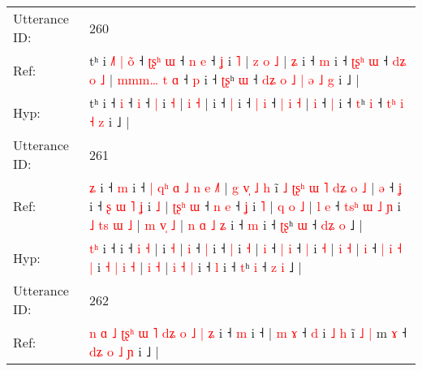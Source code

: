 \documentclass[10pt]{article}
\DeclareRobustCommand{\hl}[1]{{\textcolor{red}{#1}}}
\begin{document}
\begin{longtable}{ll}
 \\
\midrule
Utterance ID: & 260 \\
Ref: & tʰ i\hl{ }\hl{˩}\hl{˥}\hl{ }\hl{|}\hl{ }\hl{o}\hl{̃} ˧\hl{ }\hl{ʈ}\hl{ʂ}\hl{ʰ} \hl{ɯ} ˧\hl{ }\hl{n} \hl{e} ˧ \hl{ʝ} i \hl{˥} |\hl{ }\hl{z} \hl{o} \hl{˩} |\hl{ }\hl{ʑ} i ˧ \hl{m} i ˧ \hl{ʈ}\hl{ʂ}\hl{ʰ} \hl{ɯ} ˧ \hl{d}\hl{ʑ} \hl{o} \hl{˩} |\hl{ }\hl{m}\hl{m}\hl{m}\hl{…}\hl{ }\hl{t} \hl{ɑ} ˧ \hl{p} i ˧ \hl{ʈ}\hl{ʂ}ʰ \hl{ɯ} ˧\hl{ }\hl{d}\hl{ʑ}\hl{ }\hl{o} \hl{˩}\hl{ }\hl{|} \hl{ə} \hl{˩} \hl{g} i ˩ |
 \\
Hyp: & tʰ i\hl{}\hl{}\hl{}\hl{}\hl{}\hl{}\hl{}\hl{} ˧\hl{}\hl{}\hl{}\hl{} \hl{i} ˧\hl{}\hl{} \hl{i} ˧ \hl{|} i \hl{˧} |\hl{}\hl{} \hl{i} \hl{˧} |\hl{}\hl{} i ˧ \hl{|} i ˧ \hl{}\hl{}\hl{|} \hl{i} ˧ \hl{}\hl{|} \hl{i} \hl{˧} |\hl{}\hl{}\hl{}\hl{}\hl{}\hl{}\hl{} \hl{i} ˧ \hl{|} i ˧ \hl{}\hl{t}ʰ \hl{i} ˧\hl{}\hl{}\hl{}\hl{}\hl{} \hl{}\hl{t}\hl{ʰ} \hl{i} \hl{˧} \hl{z} i ˩ |
 \\
\midrule
Utterance ID: & 261 \\
Ref: & \hl{}\hl{ʑ} i ˧\hl{ }\hl{m} i ˧\hl{ }\hl{|}\hl{ }\hl{q}\hl{ʰ}\hl{ }\hl{ɑ}\hl{ }\hl{˩}\hl{ }\hl{n} \hl{e} \hl{˩}\hl{˥} |\hl{ }\hl{g}\hl{ }\hl{v}\hl{̩}\hl{ }\hl{˩}\hl{ }\hl{h} i\hl{̃}\hl{ }\hl{˩}\hl{ }\hl{ʈ}\hl{ʂ}\hl{ʰ}\hl{ }\hl{ɯ}\hl{ }\hl{˥}\hl{ }\hl{d}\hl{ʑ}\hl{ }\hl{o} \hl{˩} | \hl{ə} ˧ \hl{ʝ} i ˧\hl{ }\hl{ʂ}\hl{ }\hl{ɯ}\hl{ }\hl{˥} \hl{ʝ} i \hl{˩} |\hl{ }\hl{ʈ}\hl{ʂ}\hl{ʰ} \hl{ɯ} ˧ \hl{n} \hl{e} ˧ \hl{ʝ} i \hl{˥} |\hl{ }\hl{q} \hl{o} \hl{˩} |\hl{ }\hl{l} \hl{e} ˧ \hl{t}\hl{s}\hl{ʰ} \hl{ɯ} \hl{˩} \hl{ɲ} i \hl{˩} \hl{t}\hl{s} \hl{ɯ} \hl{˩} |\hl{ }\hl{m} \hl{v}\hl{̩} \hl{˩} |\hl{ }\hl{n} \hl{ɑ} \hl{˩} \hl{ʑ} i ˧ \hl{m} i ˧ \hl{ʈ}\hl{ʂ}ʰ \hl{ɯ} ˧ \hl{d}\hl{ʑ} \hl{o} ˩ |
 \\
Hyp: & \hl{t}\hl{ʰ} i ˧\hl{}\hl{} i ˧\hl{}\hl{}\hl{}\hl{}\hl{}\hl{}\hl{}\hl{}\hl{}\hl{}\hl{} \hl{i} \hl{}\hl{˧} |\hl{}\hl{}\hl{}\hl{}\hl{}\hl{}\hl{}\hl{}\hl{} i\hl{}\hl{}\hl{}\hl{}\hl{}\hl{}\hl{}\hl{}\hl{}\hl{}\hl{}\hl{}\hl{}\hl{}\hl{}\hl{} \hl{˧} | \hl{i} ˧ \hl{|} i ˧\hl{}\hl{}\hl{}\hl{}\hl{}\hl{} \hl{|} i \hl{˧} |\hl{}\hl{}\hl{}\hl{} \hl{i} ˧ \hl{|} \hl{i} ˧ \hl{|} i \hl{˧} |\hl{}\hl{} \hl{i} \hl{˧} |\hl{}\hl{} \hl{i} ˧ \hl{}\hl{}\hl{|} \hl{i} \hl{˧} \hl{|} i \hl{˧} \hl{}\hl{|} \hl{i} \hl{˧} |\hl{}\hl{} \hl{}\hl{i} \hl{˧} |\hl{}\hl{} \hl{i} \hl{˧} \hl{|} i ˧ \hl{l} i ˧ \hl{}\hl{t}ʰ \hl{i} ˧ \hl{}\hl{z} \hl{i} ˩ |
 \\
\midrule
Utterance ID: & 262 \\
Ref: & \hl{n}\hl{ }\hl{ɑ}\hl{ }\hl{˩}\hl{ }\hl{ʈ}\hl{ʂ}\hl{ʰ}\hl{ }\hl{ɯ}\hl{ }\hl{˥}\hl{ }\hl{d}\hl{ʑ}\hl{ }\hl{o}\hl{ }\hl{˩}\hl{ }\hl{|} \hl{ʑ} i ˧ \hl{m} i ˧ |\hl{ }\hl{m} \hl{ɤ} ˧ \hl{d} i \hl{˩} \hl{h} i\hl{̃}\hl{ }\hl{˩} \hl{|} m \hl{ɤ} ˧ \hl{d}\hl{ʑ} \hl{o} \hl{˩} \hl{ɲ} i ˩ |

\end{longtable}
\end{document}
